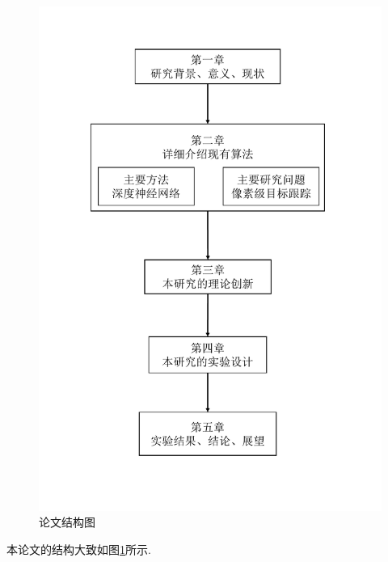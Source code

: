 \par
\begin{figure}[htbp!]
    \centering
    \includegraphics[width = .8\textwidth]{chap/img/thesis_structure.pdf}
    \caption{论文结构图}
    \label{fig:thesis_structure}
\end{figure}
\par
本论文的结构大致如图\ref{fig:thesis_structure}所示.